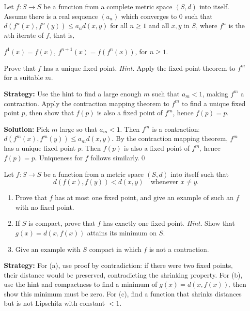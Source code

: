 \begin{problembox}
Let $f: S \to S$ be a function from a complete metric space $(S, d)$ into itself. Assume there is a real sequence $(a_n)$ which converges to $0$ such that $d(f^n(x), f^n(y)) \le a_n d(x, y)$ for all $n \ge 1$ and all $x, y$ in $S$, where $f^n$ is the $n$th iterate of $f$, that is, 

$f^1(x) = f(x)$, $f^{n+1}(x) = f(f^n(x))$, for $n \ge 1$. 

Prove that $f$ has a unique fixed point. \textit{Hint.} Apply the fixed-point theorem to $f^m$ for a suitable $m$.
\end{problembox}

\noindent\textbf{Strategy:} Use the hint to find a large enough $m$ such that $a_m < 1$, making $f^m$ a contraction. Apply the contraction mapping theorem to $f^m$ to find a unique fixed point $p$, then show that $f(p)$ is also a fixed point of $f^m$, hence $f(p) = p$.

\bigskip\noindent\textbf{Solution:}
Pick $m$ large so that $a_m<1$. Then $f^m$ is a contraction: $d(f^m(x),f^m(y))\le a_m d(x,y)$. By the contraction mapping theorem, $f^m$ has a unique fixed point $p$. Then $f(p)$ is also a fixed point of $f^m$, hence $f(p)=p$. Uniqueness for $f$ follows similarly.\qed



\begin{problembox}
Let $f: S \to S$ be a function from a metric space $(S, d)$ into itself such that
\[ d(f(x), f(y)) < d(x, y) \quad \text{whenever } x \neq y. \]
\begin{enumerate}[label=(\alph*)]
\item Prove that $f$ has at most one fixed point, and give an example of such an $f$ with no fixed point.
\item If $S$ is compact, prove that $f$ has exactly one fixed point. \textit{Hint.} Show that $g(x) = d(x, f(x))$ attains its minimum on $S$.
\item Give an example with $S$ compact in which $f$ is not a contraction.
\end{enumerate}
\end{problembox}

\noindent\textbf{Strategy:} For (a), use proof by contradiction: if there were two fixed points, their distance would be preserved, contradicting the shrinking property. For (b), use the hint and compactness to find a minimum of $g(x) = d(x, f(x))$, then show this minimum must be zero. For (c), find a function that shrinks distances but is not Lipschitz with constant $< 1$.


